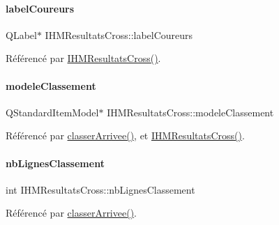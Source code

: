 \paragraph{\texorpdfstring{label\+Coureurs}{labelCoureurs}}
{\footnotesize\ttfamily Q\+Label$\ast$ I\+H\+M\+Resultats\+Cross\+::label\+Coureurs\hspace{0.3cm}{\ttfamily [private]}}



Référencé par \hyperlink{class_i_h_m_resultats_cross_a94afa0356ebc98e497dfecca3e1bb00b}{I\+H\+M\+Resultats\+Cross()}.

\mbox{\label{class_i_h_m_resultats_cross_a9d4e02948f64b6d9fef422d7f5a2b9b5}} 
\paragraph{\texorpdfstring{modele\+Classement}{modeleClassement}}
{\footnotesize\ttfamily Q\+Standard\+Item\+Model$\ast$ I\+H\+M\+Resultats\+Cross\+::modele\+Classement\hspace{0.3cm}{\ttfamily [private]}}



Référencé par \hyperlink{class_i_h_m_resultats_cross_a5f4a74c4c024aaa9d39050ac176c9e37}{classer\+Arrivee()}, et \hyperlink{class_i_h_m_resultats_cross_a94afa0356ebc98e497dfecca3e1bb00b}{I\+H\+M\+Resultats\+Cross()}.

\mbox{\label{class_i_h_m_resultats_cross_a696f826387c8fa8b9925ca468a52482e}} 
\paragraph{\texorpdfstring{nb\+Lignes\+Classement}{nbLignesClassement}}
{\footnotesize\ttfamily int I\+H\+M\+Resultats\+Cross\+::nb\+Lignes\+Classement\hspace{0.3cm}{\ttfamily [private]}}



Référencé par \hyperlink{class_i_h_m_resultats_cross_a5f4a74c4c024aaa9d39050ac176c9e37}{classer\+Arrivee()}.


